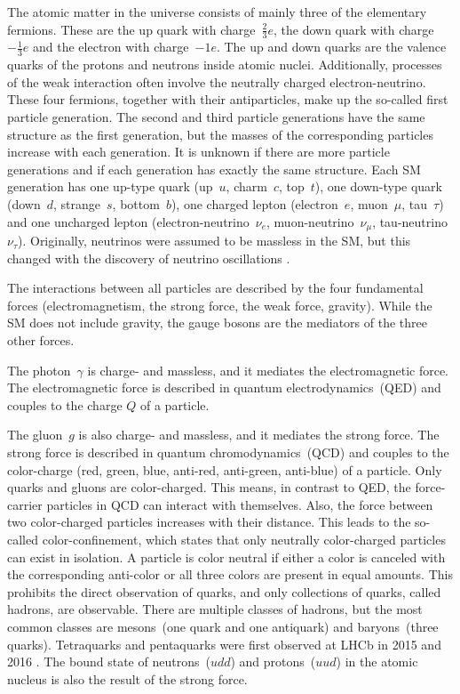 The atomic matter in the universe consists of mainly three of the elementary fermions. 
These are the up quark with charge~$\frac{2}{3}e$, the down quark with charge~$-\frac{1}{3}e$ and the electron with charge~$-1e$.
The up and down quarks are the valence quarks of the protons and neutrons inside atomic nuclei.
Additionally, processes of the weak interaction often involve the neutrally charged electron-neutrino.
These four fermions, together with their antiparticles, make up the so-called first particle generation.
The second and third particle generations have the same structure as the first generation, but the masses of the corresponding particles increase with each generation.
It is unknown if there are more particle generations and if each generation has exactly the same structure.
Each SM generation has one up-type quark (up~$u$, charm~$c$, top~$t$), one down-type quark (down~$d$, strange~$s$, bottom~$b$), one charged lepton (electron~$e$, muon~$\mu$, tau~$\tau$) and one uncharged lepton (electron-neutrino~$\nu_e$, muon-neutrino~$\nu_\mu$, tau-neutrino~$\nu_\tau$).
Originally, neutrinos were assumed to be massless in the SM, but this changed with the discovery of neutrino oscillations \cite{NeutrinoMassSK,NeutrinoMassSNO}. 

The interactions between all particles are described by the four fundamental forces (electromagnetism, the strong force, the weak force, gravity).
While the SM does not include gravity, the gauge bosons are the mediators of the three other forces.

The photon~$\gamma$ is charge- and massless, and it mediates the electromagnetic force.
The electromagnetic force is described in quantum electrodynamics~(QED) and couples to the charge $Q$ of a particle.

The gluon~$g$ is also charge- and massless, and it mediates the strong force.
The strong force is described in quantum chromodynamics~(QCD) and couples to the color-charge (red, green, blue, anti-red, anti-green, anti-blue) of a particle.
Only quarks and gluons are color-charged.
This means, in contrast to QED, the force-carrier particles in QCD can interact with themselves.
Also, the force between two color-charged particles increases with their distance.
This leads to the so-called color-confinement, which states that only neutrally color-charged particles can exist in isolation.
A particle is color neutral if either a color is canceled with the corresponding anti-color or all three colors are present in equal amounts.
This prohibits the direct observation of quarks, and only collections of quarks, called hadrons, are observable.
There are multiple classes of hadrons, but the most common classes are mesons~(one quark and one antiquark) and baryons~(three quarks).
Tetraquarks and pentaquarks were first observed at LHCb in 2015 and 2016 \cite{TetraquarkLHCb,PentaquarkLHCb}. 
The bound state of neutrons~($udd$) and protons~($uud$) in the atomic nucleus is also the result of the strong force.

